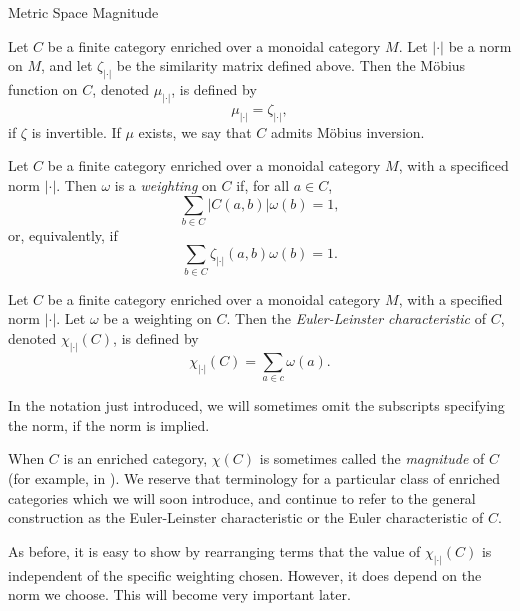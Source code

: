 \documentclass[12pt]{pom_thesis}
\begin{document}
\begin{chapter}{Metric Space Magnitude}
\begin{defn}
Let $C$ be a finite category enriched over a monoidal category $M$. Let $|\cdot|$ be a norm on $M$, and let $\zeta_{|\cdot|}$ be the similarity matrix defined above. Then the M\"obius function on $C$, denoted $\mu_{|\cdot|}$, is defined by 
\[
\mu_{|\cdot|} = \zeta_{|\cdot|},
\]
if $\zeta$ is invertible. If $\mu$ exists, we say that $C$ admits M\"obius inversion.
\end{defn}

\begin{defn}
Let $C$ be a finite category enriched over a monoidal category $M$, with a specificed norm $|\cdot|$. Then $\omega$ is a \emph{weighting} on $C$ if, for all $a \in C$, 
\[
\sum_{b \in C}|C(a,b)|\omega(b) = 1,
\]
or, equivalently, if
\[
\sum_{b \in C}\zeta_{|\cdot|}(a,b)\omega(b) = 1.
\]
\end{defn}

\begin{defn}
Let $C$ be a finite category enriched over a monoidal category $M$, with a specified norm $|\cdot|$. Let $\omega$ be a weighting on $C$. Then the \emph{Euler-Leinster characteristic} of $C$, denoted $\chi_{|\cdot|}(C)$, is defined by
\[
\chi_{|\cdot|}(C) = \sum_{a \in c} \omega(a).
\]
\end{defn}
In the notation just introduced, we will sometimes omit the subscripts specifying the norm, if the norm is implied.
\begin{rmk}
When $C$ is an enriched category, $\chi(C)$ is sometimes called the \emph{magnitude} of $C$ (for example, in \cite{Lein4}). We reserve that terminology for a particular class of enriched categories which we will soon introduce, and continue to refer to the general construction as the Euler-Leinster characteristic or the Euler characteristic of $C$.
\end{rmk}
\begin{rmk}
As before, it is easy to show by rearranging terms that the value of $\chi_{|\cdot|}(C)$ is independent of the specific weighting chosen. However, it does depend on the norm we choose. This will become very important later.
\end{rmk}


\end{chapter}
\end{document}
